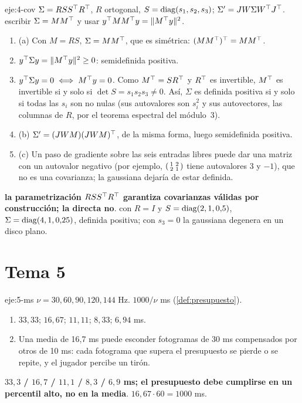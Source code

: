 \begin{solucion}{eje:4-cov}
\datos $\Sigma=RSS^\top R^\top$, $R$ ortogonal, $S=\operatorname{diag}(s_1,s_2,s_3)$; $\Sigma'=JW\Sigma W^\top J^\top$.
\planteamiento escribir $\Sigma=MM^\top$ y usar $y^\top MM^\top y=\lVert M^\top y\rVert^2$.
\pasos
\begin{enumerate}[label=\arabic*.]
  \item (a) Con $M=RS$, $\Sigma=MM^\top$, que es simétrica: $(MM^\top)^\top=MM^\top$.
  \item $y^\top\Sigma y=\lVert M^\top y\rVert^2\ge 0$: semidefinida positiva.
  \item $y^\top\Sigma y=0\iff M^\top y=0$. Como $M^\top=SR^\top$ y $R^\top$ es invertible, $M^\top$ es invertible si y solo si $\det S=s_1s_2s_3\ne 0$. Así, $\Sigma$ es definida positiva si y solo si todas las $s_i$ son no nulas (sus autovalores son $s_i^2$ y sus autovectores, las columnas de $R$, por el teorema espectral del módulo~3).
  \item (b) $\Sigma'=(JWM)(JWM)^\top$, de la misma forma, luego semidefinida positiva.
  \item (c) Un paso de gradiente sobre las seis entradas libres puede dar una matriz con un autovalor negativo (por ejemplo, $\begin{psmallmatrix}1&2\\2&1\end{psmallmatrix}$ tiene autovalores $3$ y $-1$), que no es una covarianza; la gaussiana dejaría de estar definida.
\end{enumerate}
\resultado \textbf{la parametrización $RSS^\top R^\top$ garantiza covarianzas válidas por construcción; la directa no}.
\comprobacion con $R=I$ y $S=\operatorname{diag}(2,1,0{,}5)$, $\Sigma=\operatorname{diag}(4,1,0{,}25)$, definida positiva; con $s_3=0$ la gaussiana degenera en un disco plano.
\end{solucion}

\section{Tema 5}

\begin{solucion}{eje:5-ms}
\datos $\nu=30,60,90,120,144$ Hz.
\planteamiento $1000/\nu$ ms (\cref{def:presupuesto}).
\pasos
\begin{enumerate}[label=\arabic*.]
  \item $33{,}33$; $16{,}67$; $11{,}11$; $8{,}33$; $6{,}94$ ms.
  \item Una media de 16,7 ms puede esconder fotogramas de 30 ms compensados por otros de 10 ms: cada fotograma que supera el presupuesto se pierde o se repite, y el jugador percibe un tirón.
\end{enumerate}
\resultado \textbf{$33{,}3$ / $16{,}7$ / $11{,}1$ / $8{,}3$ / $6{,}9$ ms; el presupuesto debe cumplirse en un percentil alto, no en la media}.
\comprobacion $16{,}67\cdot 60=1000$ ms.
\end{solucion}

